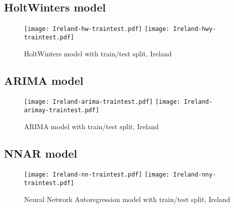 \subsection{HoltWinters model}
\begin{figure}[H]
  \texttt{[image: Ireland-hw-traintest.pdf]} \label{fig:ireland-hw-traintest}
\endminipage\hfill
{}
  \texttt{[image: Ireland-hwy-traintest.pdf]} \label{fig:ireland-hwy-traintest}
\endminipage
\caption{HoltWinters model with train/test split, Ireland}
\end{figure}


\subsection{ARIMA model}
\begin{figure}[H]
  \texttt{[image: Ireland-arima-traintest.pdf]} \label{fig:ireland-arima-traintest}
\endminipage\hfill
{}
  \texttt{[image: Ireland-arimay-traintest.pdf]} \label{fig:ireland-arimay-traintest}
\endminipage
\caption{ARIMA model with train/test split, Ireland}
\end{figure}



\subsection{NNAR model}
\begin{figure}[H]
  \texttt{[image: Ireland-nn-traintest.pdf]} \label{fig:ireland-nn-traintest}
\endminipage\hfill
{}
  \texttt{[image: Ireland-nny-traintest.pdf]} \label{fig:ireland-nny-traintest}
\endminipage
\caption{Neural Network Autoregression model with train/test split, Ireland}
\end{figure}